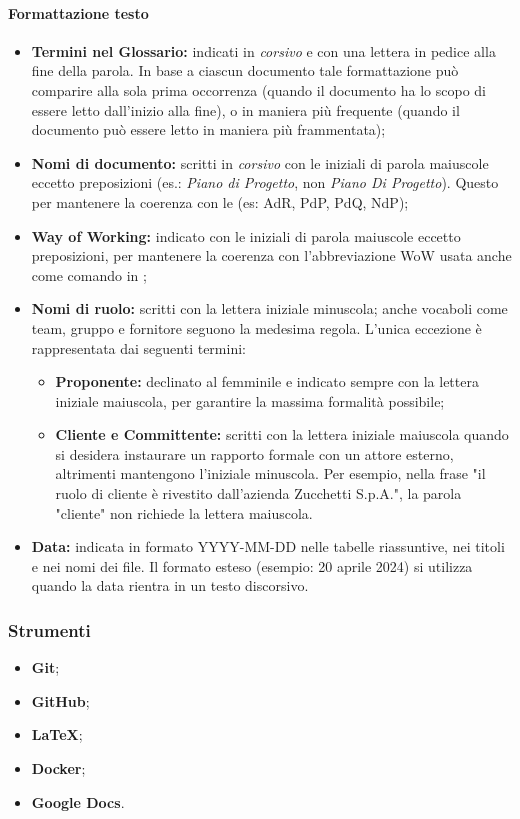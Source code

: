 \paragraph{Formattazione testo}
\begin{itemize}
  \item \textbf{Termini nel Glossario:} indicati in \textit{corsivo} e con una lettera  in pedice alla fine della parola. In base a ciascun documento tale formattazione può comparire alla sola prima occorrenza (quando il documento ha lo scopo di essere letto dall'inizio alla fine), o in maniera più frequente (quando il documento può essere letto in maniera più frammentata);
  \item \textbf{Nomi di documento:} scritti in \textit{corsivo} con le iniziali di parola maiuscole eccetto preposizioni (es.: \textit{Piano di Progetto}, non \textit{Piano Di Progetto}). Questo per mantenere la coerenza con le  (es: AdR, PdP, PdQ, NdP);
  \item \textbf{Way of Working:} indicato con le iniziali di parola maiuscole eccetto preposizioni, per mantenere la coerenza con l'abbreviazione WoW usata anche come comando in ;
  \item \textbf{Nomi di ruolo:} scritti con la lettera iniziale minuscola; anche vocaboli come team, gruppo e fornitore seguono la medesima regola. L'unica eccezione è rappresentata dai seguenti termini:
  \begin{itemize}
    \item \textbf{Proponente:} declinato al femminile e indicato sempre con la lettera iniziale maiuscola, per garantire la massima formalità possibile;
    \item \textbf{Cliente e Committente:} scritti con la lettera iniziale maiuscola quando si desidera instaurare un rapporto formale con un attore esterno, altrimenti mantengono l'iniziale minuscola. Per esempio, nella frase "il ruolo di cliente è rivestito dall'azienda Zucchetti S.p.A.", la parola "cliente" non richiede la lettera maiuscola.
  \end{itemize}
  \item \textbf{Data:} indicata in formato YYYY-MM-DD nelle tabelle riassuntive, nei titoli e nei nomi dei file. Il formato esteso (esempio: 20 aprile 2024) si utilizza quando la data rientra in un testo discorsivo.
\end{itemize}

\subsubsection{Strumenti}
\IntroStrumenti
\begin{itemize}
  \item \textbf{Git};
  \item \textbf{GitHub};
  \item \textbf{LaTeX};
  \item \textbf{Docker};
  \item \textbf{Google Docs}.
\end{itemize}
